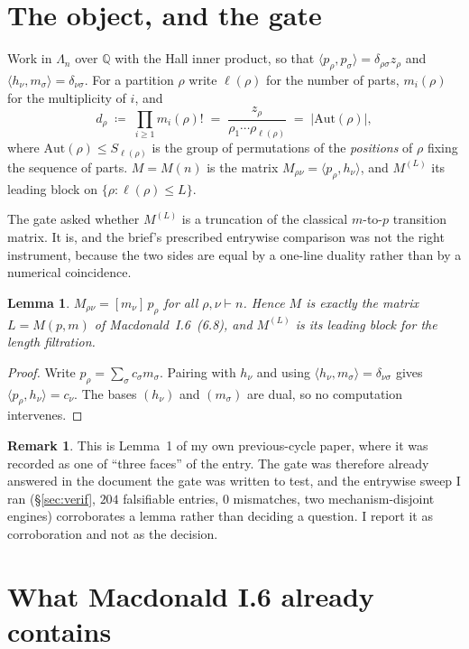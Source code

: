 \documentclass[11pt]{article}
\newtheorem{lemma}[theorem]{Lemma}
\theoremstyle{definition}
\newtheorem{remark}[theorem]{Remark}
\newcommand{\Lam}{\Lambda}
\newcommand{\Aut}{\mathrm{Aut}}
\begin{document}
\section{The object, and the gate}

Work in $\Lam_n$ over $\mathbb{Q}$ with the Hall inner product, so that
$\langle p_\rho,p_\sigma\rangle=\delta_{\rho\sigma}z_\rho$ and
$\langle h_\nu,m_\sigma\rangle=\delta_{\nu\sigma}$. For a partition $\rho$ write $\ell(\rho)$ for the
number of parts, $m_i(\rho)$ for the multiplicity of $i$, and
\[
  d_\rho\;\coloneqq\;\prod_{i\ge1}m_i(\rho)!\;=\;\frac{z_\rho}{\rho_1\cdots\rho_{\ell(\rho)}}
  \;=\;|\Aut(\rho)|,
\]
where $\Aut(\rho)\le S_{\ell(\rho)}$ is the group of permutations of the \emph{positions} of $\rho$
fixing the sequence of parts. $M=M(n)$ is the matrix $M_{\rho\nu}=\langle p_\rho,h_\nu\rangle$, and
$M^{(L)}$ its leading block on $\{\rho:\ell(\rho)\le L\}$.

The gate asked whether $M^{(L)}$ is a truncation of the classical $m$-to-$p$ transition matrix. It is,
and the brief's prescribed entrywise comparison was not the right instrument, because the two sides
are equal by a one-line duality rather than by a numerical coincidence.

\begin{lemma}\label{lem:gate}
$M_{\rho\nu}=[m_\nu]\,p_\rho$ for all $\rho,\nu\vdash n$. Hence $M$ is exactly the matrix
$L=M(p,m)$ of Macdonald~I.6~(6.8), and $M^{(L)}$ is its leading block for the length filtration.
\end{lemma}

\begin{proof}
Write $p_\rho=\sum_\sigma c_\sigma m_\sigma$. Pairing with $h_\nu$ and using
$\langle h_\nu,m_\sigma\rangle=\delta_{\nu\sigma}$ gives $\langle p_\rho,h_\nu\rangle=c_\nu$. The
bases $(h_\nu)$ and $(m_\sigma)$ are dual, so no computation intervenes.
\end{proof}

\begin{remark}
This is Lemma~1 of my own previous-cycle paper, where it was recorded as one of ``three faces'' of
the entry. The gate was therefore already answered in the document the gate was written to test, and
the entrywise sweep I ran (\S\ref{sec:verif}, $204$ falsifiable entries, $0$ mismatches, two
mechanism-disjoint engines) corroborates a lemma rather than deciding a question. I report it as
corroboration and not as the decision.
\end{remark}

\section{What Macdonald I.6 already contains}\label{sec:absorb}
\end{document}
